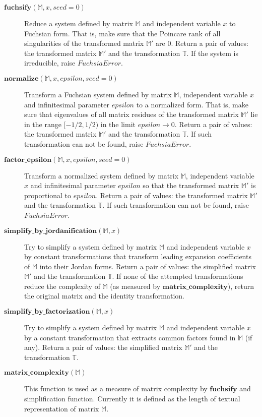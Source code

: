 \documentclass[12pt,twoside,a4paper]{article}
\def\F#1{\mathbf{#1}} %
\def\M#1{\mathbb{#1}} %
\def\functionitem#1#2{\item[$\F{#1}(#2)$]}
\begin{document}
\begin{description}

\functionitem{fuchsify}{\M M, x, seed=0}
Reduce a system defined by matrix $\M M$ and independent variable
$x$ to Fuchsian form. That is, make sure that the Poincare rank
of all singularities of the transformed matrix $\M M'$ are
$0$. Return a pair of values: the transformed matrix $\M M'$
and the transformation $\M T$. If the system is irreducible,
raise $FuchsiaError$.

\functionitem{normalize}{\M M, x, epsilon, seed=0}
Transform a Fuchsian system defined by matrix $\M M$, independent
variable $x$ and infinitesimal parameter $epsilon$ to a normalized
form. That is, make sure that eigenvalues of all matrix residues
of the transformed matrix $\M M'$ lie in the range $[-1/2, 1/2)$
in the limit $epsilon\to0$. Return a pair of values: the
transformed matrix $\M M'$ and the transformation $\M T$. If
such transformation can not be found, raise $FuchsiaError$.

\functionitem{factor\_epsilon}{\M M, x, epsilon, seed=0}
Transform a normalized system defined by matrix $\M M$, independent
variable $x$ and infinitesimal parameter $epsilon$ so that the
transformed matrix $\M M'$ is proportional to $epsilon$. Return a
pair of values: the transformed matrix $\M M'$ and the transformation
$\M T$. If such transformation can not be found, raise $FuchsiaError$.

\functionitem{simplify\_by\_jordanification}{\M M, x}
Try to simplify a system defined by matrix $\M M$ and independent
variable $x$ by constant transformations that transform leading
expansion coefficients of $\M M$ into their Jordan forms. Return a
pair of values: the simplified matrix $\M M'$ and the transformation
$\M T$. If none of the attempted transformations reduce the
complexity of $\M M$ (as measured by $\F{matrix\_complexity}$),
return the original matrix and the identity transformation.

\functionitem{simplify\_by\_factorization}{\M M, x}
Try to simplify a system defined by matrix $\M M$ and independent
variable $x$ by a constant transformation that extracts common
factors found in $\M M$ (if any). Return a pair of values:
the simplified matrix $\M M'$ and the transformation $\M T$.

\functionitem{matrix\_complexity}{\M M}
This function is used as a measure of matrix complexity by
$\F{fuchsify}$ and simplification function. Currently it is
defined as the length of textual representation of matrix $\M M$.


\end{description}
\end{document}
